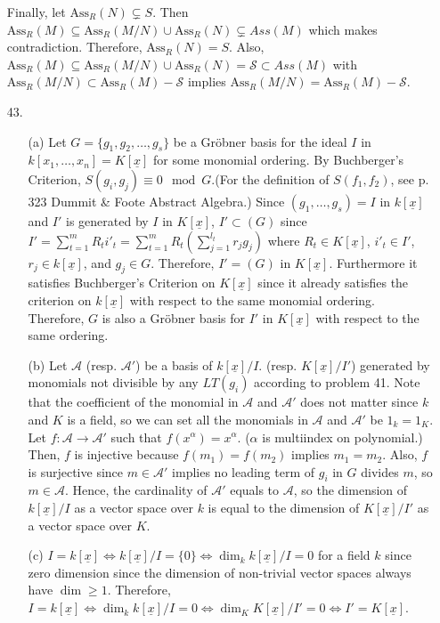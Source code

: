 \documentclass[12pt]{article}
\newcommand{\Ass}{\text{Ass}_R}
\begin{document}
\begin{enumerate}
Finally, let $\Ass(N)\subsetneq S$. Then $\Ass(M)\subseteq \Ass(M/N)\cup \Ass(N)\subsetneq Ass(M)$ which makes contradiction. Therefore, $\Ass(N)=S$. Also, $\Ass(M)\subseteq \Ass(M/N)\cup \Ass(N)=\mathcal{S}\subset Ass(M)$ with $\Ass(M/N)\subset \Ass(M)-\mathcal{S}$ implies $\Ass(M/N)=\Ass(M)-\mathcal{S}$.
\item[43.] \begin{enumerate}
\item[(a)] Let $G=\{g_1, g_2, \ldots, g_s\}$ be a Gr\"obner basis for the ideal $I$ in $k[x_1, \ldots, x_n]=K[\underline{x}]$ for some monomial ordering. By Buchberger's Criterion, $S(g_i, g_j)\equiv 0 \mod{G}$.(For the definition of $S(f_1, f_2)$, see p. 323 Dummit \& Foote Abstract Algebra.) Since $(g_1, \ldots, g_s)=I$ in $k[\underline{x}]$ and $I'$ is generated by $I$ in $K[\underline{x}]$, $I'\subset (G)$ since $I'=\sum\limits_{t=1}^m R_t i'_t=\sum\limits_{t=1}^m R_t \left(\sum\limits_{j=1}^{l_t} r_j g_j\right)$ where $R_t\in K[\underline{x}]$, $i'_t\in I'$, $r_j\in k[\underline{x}]$, and $g_j\in G$. Therefore, $I'=(G)$ in $K[\underline{x}]$. Furthermore it satisfies Buchberger's Criterion on $K[\underline{x}]$ since it already satisfies the criterion on $k[\underline{x}]$ with respect to the same monomial ordering. Therefore, $G$ is also a Gr\"obner basis for $I'$ in $K[\underline{x}]$ with respect to the same ordering.
\item[(b)] Let $\mathcal{A}$ (resp. $\mathcal{A}'$) be a basis of $k[\underline{x}]/I$. (resp. $K[\underline{x}]/I'$) generated by monomials not divisible by any $LT(g_i)$ according to problem 41. Note that the coefficient of the monomial in $\mathcal{A}$ and $\mathcal{A}'$ does not matter since $k$ and $K$ is a field, so we can set all the monomials in $\mathcal{A}$ and $\mathcal{A}'$ be $1_k=1_K$. Let $f:\mathcal{A}\rightarrow \mathcal{A}'$ such that $f(x^\alpha)=x^\alpha$. ($\alpha$ is multiindex on polynomial.) Then, $f$ is injective because $f(m_1)=f(m_2)$ implies $m_1=m_2$. Also, $f$ is surjective since $m\in \mathcal{A}'$ implies no leading term of $g_i$ in $G$ divides $m$, so $m\in \mathcal{A}$. Hence, the cardinality of $\mathcal{A}'$ equals to $\mathcal{A}$, so the dimension of $k[\underline{x}]/I$ as a vector space over $k$ is equal to the dimension of $K[\underline{x}]/I'$ as a vector space over $K$.
\item[(c)] $I=k[\underline{x}]\Leftrightarrow k[\underline{x}]/I=\{0\}\Leftrightarrow \dim_k k[\underline{x}]/I=0$ for a field $k$ since zero dimension since the dimension of non-trivial vector spaces always have $\dim \geq 1$. Therefore, $I=k[\underline{x}]\Leftrightarrow\dim_k  k[\underline{x}]/I=0\Leftrightarrow\dim_K K[\underline{x}]/I'=0\Leftrightarrow I'=K[\underline{x}]$.
\end{enumerate}
\end{enumerate}
\end{document}
